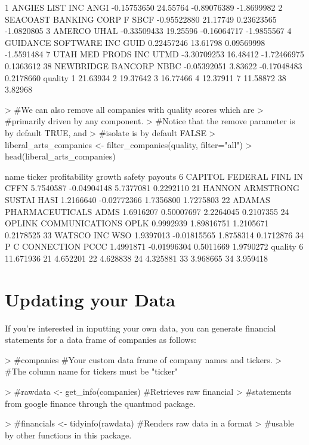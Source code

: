 \documentclass[12pt]{article}
\begin{document}
\begin{Schunk}
\begin{Soutput}
1          ANGIES LIST INC   ANGI   -0.15753650 24.55764 -0.89076389 -1.8699982
2  SEACOAST BANKING CORP F   SBCF   -0.95522880 21.17749  0.23623565 -1.0820805
3                   AMERCO   UHAL   -0.33509433 19.25596 -0.16064717 -1.9855567
4    GUIDANCE SOFTWARE INC   GUID    0.22457246 13.61798  0.09569998 -1.5591484
7       UTAH MED PRODS INC   UTMD   -3.30709253 16.48412 -1.72466975  0.1363612
38       NEWBRIDGE BANCORP   NBBC   -0.05392051  3.83622 -0.17048483  0.2178660
    quality
1  21.63934
2  19.37642
3  16.77466
4  12.37911
7  11.58872
38  3.82968
\end{Soutput}
\begin{Sinput}
> #We can also remove all companies with quality scores which are 
> #primarily driven by any component.
> #Notice that the remove parameter is by default TRUE, and 
> #isolate is by default FALSE
> liberal_arts_companies <- filter_companies(quality, filter="all")
> head(liberal_arts_companies)
\end{Sinput}
\begin{Soutput}
                      name ticker profitability      growth    safety   payouts
6  CAPITOL FEDERAL FINL IN   CFFN     5.7540587 -0.04904148 5.7377081 0.2292110
21 HANNON ARMSTRONG SUSTAI   HASI     1.2166640 -0.02772366 1.7356800 1.7275803
22  ADAMAS PHARMACEUTICALS   ADMS     1.6916207  0.50007697 2.2264045 0.2107355
24   OPLINK COMMUNICATIONS   OPLK     0.9992939  1.89816751 1.2105671 0.2178525
33              WATSCO INC    WSO     1.9397013 -0.01815565 1.8758314 0.1712876
34          P C CONNECTION   PCCC     1.4991871 -0.01996304 0.5011669 1.9790272
     quality
6  11.671936
21  4.652201
22  4.628838
24  4.325881
33  3.968665
34  3.959418
\end{Soutput}
\end{Schunk}


\section*{Updating your Data}
If you're interested in inputting your own data, you can generate financial statements for a data frame of companies as follows:

\begin{Schunk}
\begin{Sinput}
> #companies #Your custom data frame of company names and tickers. 
> #The column name for tickers must be "ticker"
\end{Sinput}
\end{Schunk}
\begin{Schunk}
\begin{Sinput}
> #rawdata <- get_info(companies) #Retrieves raw financial 
> #statements from google finance through the quantmod package.
\end{Sinput}
\end{Schunk}
\begin{Schunk}
\begin{Sinput}
> #financials <- tidyinfo(rawdata) #Renders raw data in a format 
> #usable by other functions in this package.
\end{Sinput}
\end{Schunk}
\end{document}
